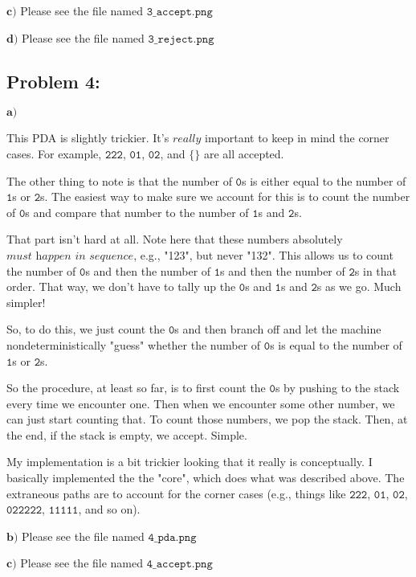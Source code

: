 \documentclass[a4paper]{article}
\begin{document}
$\textbf{c)}$ Please see the file named $\texttt{3\_accept.png}$

$\textbf{d)}$ Please see the file named $\texttt{3\_reject.png}$

\subsection*{Problem 4:} $\textbf{a)}$

This PDA is slightly trickier. It's $\textit{really}$ important to keep in mind the corner cases. For example, $\texttt{222}$, $\texttt{01}$, $\texttt{02}$, and $\texttt{\{\}}$ are all accepted.

The other thing to note is that the number of $\texttt{0}$s is either equal to the number of $\texttt{1}$s or $\texttt{2}$s. The easiest way to make sure we account for this is to count the number of $\texttt{0}$s and compare that number to the number of $\texttt{1}$s and $\texttt{2}$s.

That part isn't hard at all. Note here that these numbers absolutely $\textit{must happen in sequence}$, e.g., "123", but never "132". This allows us to count the number of $\texttt{0}$s and then the number of $\texttt{1}$s and then the number of $\texttt{2}$s in that order. That way, we don't have to tally up the $\texttt{0}$s and $\texttt{1}$s and $\texttt{2}$s as we go. Much simpler!

So, to do this, we just count the $\texttt{0}$s and then branch off and let the machine nondeterministically "guess" whether the number of $\texttt{0}$s is equal to the number of $\texttt{1}$s or $\texttt{2}$s.

So the procedure, at least so far, is to first count the $\texttt{0}$s by pushing to the stack every time we encounter one. Then when we encounter some other number, we can just start counting that. To count those numbers, we pop the stack. Then, at the end, if the stack is empty, we accept. Simple.

My implementation is a bit trickier looking that it really is conceptually. I basically implemented the the "core", which does what was described above. The extraneous paths are to account for the corner cases (e.g., things like  $\texttt{222}$, $\texttt{01}$, $\texttt{02}$, $\texttt{022222}$, $\texttt{11111}$, and so on).

$\textbf{b)}$ Please see the file named $\texttt{4\_pda.png}$

$\textbf{c)}$ Please see the file named $\texttt{4\_accept.png}$
\end{document}
